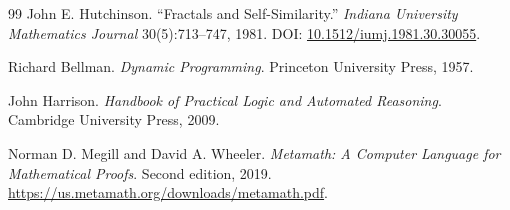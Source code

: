 \documentclass[11pt]{article}
\theoremstyle{definition}
\theoremstyle{remark}
\begin{document}
\begin{thebibliography}{99}
John E. Hutchinson.
``Fractals and Self-Similarity.''
\emph{Indiana University Mathematics Journal} 30(5):713--747, 1981.
DOI: \href{https://doi.org/10.1512/iumj.1981.30.30055}{10.1512/iumj.1981.30.30055}.

Richard Bellman.
\emph{Dynamic Programming}.
Princeton University Press, 1957.

John Harrison.
\emph{Handbook of Practical Logic and Automated Reasoning}.
Cambridge University Press, 2009.

Norman D. Megill and David A. Wheeler.
\emph{Metamath: A Computer Language for Mathematical Proofs}.
Second edition, 2019.
\url{https://us.metamath.org/downloads/metamath.pdf}.

\end{thebibliography}
\end{document}

